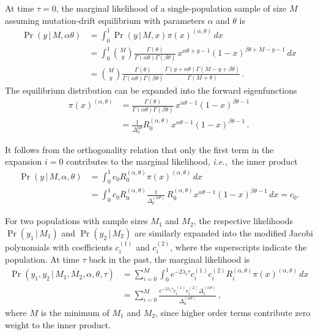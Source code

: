 \documentclass[preprint]{elsarticle}
\newcommand\given{{\,|\,}}
\newcommand\ie{{\it i.e.,}}
\begin{document}
At time $\tau=0$, the marginal likelihood of a single-population sample of size $M$ assuming mutation-drift equilibrium with parameters $\alpha$ and $\theta$ is
\begin{equation}
\begin{split}
    \Pr(y\given M,\alpha\theta)
    &=\int_0^1 \Pr(y\given M,x) \pi(x)^{(\alpha,\theta)}\,dx\\
    &=\int_0^1 \binom{M}{y}\frac{\Gamma(\theta)}{\Gamma(\alpha\theta)\Gamma(\beta\theta)}\,x^{\alpha\theta+y-1}(1-x)^{\beta\theta+M-y-1}\,dx\\
    &=\binom{M}{y}\frac{\Gamma(\theta)}{\Gamma(\alpha\theta)\Gamma(\beta\theta)}
    \frac{\Gamma(y+\alpha\theta)\Gamma(M-y+\beta\theta)}{\Gamma(M+\theta)}\,.
\end{split}
\end{equation}
The equilibrium distribution can be expanded into the forward eigenfunctions
\begin{equation}
\begin{split}
    \pi(x)^{(\alpha,\theta)}&=\frac{\Gamma(\theta)}{\Gamma(\alpha\theta)\Gamma(\beta\theta)}\,x^{\alpha\theta-1}(1-x)^{\beta\theta-1}\\
    &=\frac{1}{\Delta_0^{\alpha\theta}}R_0^{(\alpha,\theta)}\,x^{\alpha\theta-1}(1-x)^{\beta\theta-1}\,.
\end{split}
\end{equation}

It follows from the orthogonality relation that only the first term in the expansion $i=0$ contributes to the marginal likelihood, \ie\ the inner product
\begin{equation}
\begin{split}
    \Pr(y\given M,\alpha,\theta)&=\int_0^1 c_0 R_0^{(\alpha,\theta)}\pi(x)^{(\alpha,\theta)}\,dx\\
    &=\int_0^1 c_0 R_0^{(\alpha,\theta)} \frac{1}{\Delta_0^{(\alpha\theta)}}\,R_0^{(\alpha,\theta)} x^{\alpha\theta-1}(1-x)^{\beta\theta-1}\,dx
    =c_0.
\end{split}
\end{equation}

For two populations with sample sizes $M_1$ and $M_2$, the respective likelihoods $\Pr(y_1\given M_1)$ and $\Pr(y_2\given M_2)$ are similarly expanded into the modified Jacobi polynomials with coefficients $c_i^{(1)}$ and $c_i^{(2)}$, where the superscripts indicate the population. At time $\tau$ back in the past, the marginal likelihood is
\begin{equation}
\begin{split}
    \Pr(y_1,y_2\given M_1,M_2,\alpha,\theta,\tau)&=
    \sum_{i=0}^{M}\int_0^1 e^{-2\lambda_i\tau}c_i^{(1)}c_i^{(2)} R_i^{(\alpha,\theta)}\pi(x)^{(\alpha,\theta)}  \,dx\\
    &=\sum_{i=0}^{M}\frac{e^{-2\lambda_i\tau}c_i^{(1)} c_i^{(2)}\Delta_i^{(\alpha\theta)}}{\Delta_0^{(\alpha\theta)}}\,,
\end{split}
\end{equation}
where $M$ is the minimum of $M_1$ and $M_2$, since higher order terms contribute zero weight to the inner product. 
\end{document}
